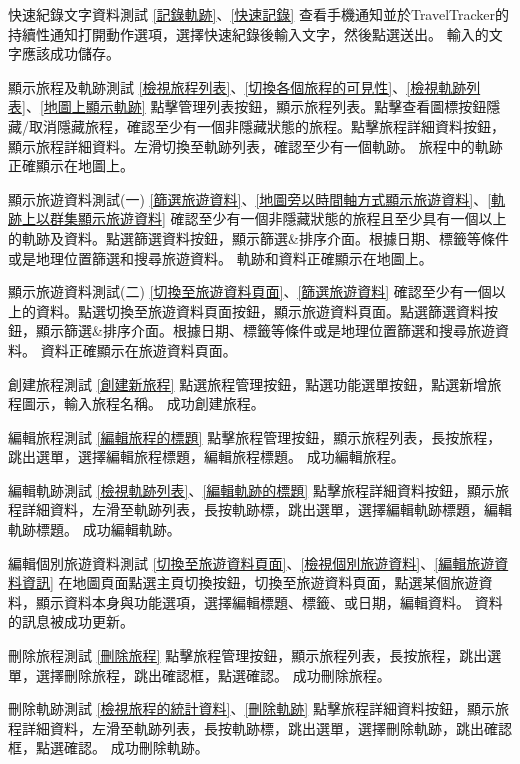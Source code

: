 \addtestcase
  {快速紀錄文字資料測試}
  {}
  {\ref{記錄軌跡}、\ref{快速記錄}}
  {查看手機通知並於TravelTracker的持續性通知打開動作選項，選擇快速紀錄後輸入文字，然後點選送出。}
  {輸入的文字應該成功儲存。}

\addtestcase
  {顯示旅程及軌跡測試}
  {}
  {\ref{檢視旅程列表}、\ref{切換各個旅程的可見性}、\ref{檢視軌跡列表}、\ref{地圖上顯示軌跡}}
  {點擊管理列表按鈕，顯示旅程列表。點擊查看圖標按鈕隱藏/取消隱藏旅程，確認至少有一個非隱藏狀態的旅程。點擊旅程詳細資料按鈕，顯示旅程詳細資料。左滑切換至軌跡列表，確認至少有一個軌跡。}
  {旅程中的軌跡正確顯示在地圖上。}

\addtestcase
  {顯示旅遊資料測試(一)}
  {}
  {\ref{篩選旅遊資料}、\ref{地圖旁以時間軸方式顯示旅遊資料}、\ref{軌跡上以群集顯示旅遊資料}}
  {確認至少有一個非隱藏狀態的旅程且至少具有一個以上的軌跡及資料。點選篩選資料按鈕，顯示篩選\&排序介面。根據日期、標籤等條件或是地理位置篩選和搜尋旅遊資料。}
  {軌跡和資料正確顯示在地圖上。}

\addtestcase
  {顯示旅遊資料測試(二)}
  {}
  {\ref{切換至旅遊資料頁面}、\ref{篩選旅遊資料}}
  {確認至少有一個以上的資料。點選切換至旅遊資料頁面按鈕，顯示旅遊資料頁面。點選篩選資料按鈕，顯示篩選\&排序介面。根據日期、標籤等條件或是地理位置篩選和搜尋旅遊資料。}
  {資料正確顯示在旅遊資料頁面。}

\addtestcase
  {創建旅程測試}
  {}
  {\ref{創建新旅程}}
  {點選旅程管理按鈕，點選功能選單按鈕，點選新增旅程圖示，輸入旅程名稱。}
  {成功創建旅程。}

\addtestcase
  {編輯旅程測試}
  {}
  {\ref{編輯旅程的標題}}
  {點擊旅程管理按鈕，顯示旅程列表，長按旅程，跳出選單，選擇編輯旅程標題，編輯旅程標題。}
  {成功編輯旅程。}

\addtestcase
  {編輯軌跡測試}
  {}
  {\ref{檢視軌跡列表}、\ref{編輯軌跡的標題}}
  {點擊旅程詳細資料按鈕，顯示旅程詳細資料，左滑至軌跡列表，長按軌跡標，跳出選單，選擇編輯軌跡標題，編輯軌跡標題。}
  {成功編輯軌跡。}

\addtestcase
  {編輯個別旅遊資料測試}
  {}
  {\ref{切換至旅遊資料頁面}、\ref{檢視個別旅遊資料}、\ref{編輯旅遊資料資訊}}
  {在地圖頁面點選主頁切換按鈕，切換至旅遊資料頁面，點選某個旅遊資料，顯示資料本身與功能選項，選擇編輯標題、標籤、或日期，編輯資料。}
  {資料的訊息被成功更新。}

\addtestcase
  {刪除旅程測試}
  {}
  {\ref{刪除旅程}}
  {點擊旅程管理按鈕，顯示旅程列表，長按旅程，跳出選單，選擇刪除旅程，跳出確認框，點選確認。}
  {成功刪除旅程。}

\addtestcase
  {刪除軌跡測試}
  {}
  {\ref{檢視旅程的統計資料}、\ref{刪除軌跡}}
  {點擊旅程詳細資料按鈕，顯示旅程詳細資料，左滑至軌跡列表，長按軌跡標，跳出選單，選擇刪除軌跡，跳出確認框，點選確認。}
  {成功刪除軌跡。}

